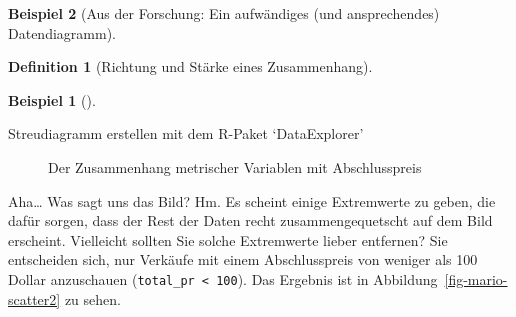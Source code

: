 \documentclass[
  a4paper,
]{scrbook}
\newenvironment{Shaded}{\begin{snugshade}}{\end{snugshade}}
\newcommand{\AttributeTok}[1]{\textcolor[rgb]{0.40,0.45,0.13}{#1}}
\newcommand{\FunctionTok}[1]{\textcolor[rgb]{0.28,0.35,0.67}{#1}}
\newcommand{\NormalTok}[1]{\textcolor[rgb]{0.00,0.23,0.31}{#1}}
\newcommand{\SpecialCharTok}[1]{\textcolor[rgb]{0.37,0.37,0.37}{#1}}
\newcommand{\StringTok}[1]{\textcolor[rgb]{0.13,0.47,0.30}{#1}}
\theoremstyle{definition}
\newtheorem{example}{Beispiel}[chapter]
\theoremstyle{definition}
\newtheorem{definition}{Definition}[chapter]
\theoremstyle{definition}
\theoremstyle{remark}
\begin{document}
\begin{example}[Aus der Forschung: Ein aufwändiges (und ansprechendes)
Datendiagramm]
\begin{definition}[Richtung und Stärke eines
Zusammenhang]
\begin{example}[]
\begin{codelisting}

\caption{\label{lst-scatterplot}Streudiagramm erstellen mit dem R-Paket
`DataExplorer'}

\centering{

\begin{Shaded}
\begin{Highlighting}[]
\NormalTok{mariokart }\SpecialCharTok{\%\textgreater{}\%} 
  \FunctionTok{select}\NormalTok{(duration, n\_bids, start\_pr,}
\NormalTok{         ship\_pr, total\_pr, }
\NormalTok{         seller\_rate, wheels) }\SpecialCharTok{\%\textgreater{}\%} 
  \FunctionTok{plot\_scatterplot}\NormalTok{(}\AttributeTok{by =} \StringTok{"total\_pr"}\NormalTok{)}
\end{Highlighting}
\end{Shaded}

}

\end{codelisting}%

\begin{figure}[H]


\caption{\label{fig-mario-scatter}Der Zusammenhang metrischer Variablen
mit Abschlusspreis}

\end{figure}%

Aha\ldots{} Was sagt uns das Bild? Hm. Es scheint einige Extremwerte zu
geben, die dafür sorgen, dass der Rest der Daten recht
zusammengequetscht auf dem Bild erscheint. Vielleicht sollten Sie solche
Extremwerte lieber entfernen? Sie entscheiden sich, nur Verkäufe mit
einem Abschlusspreis von weniger als 100 Dollar anzuschauen
(\texttt{total\_pr\ \textless{}\ 100}). Das Ergebnis ist in
Abbildung~\ref{fig-mario-scatter2} zu sehen.


\end{example}
\end{definition}
\end{example}
\end{document}
